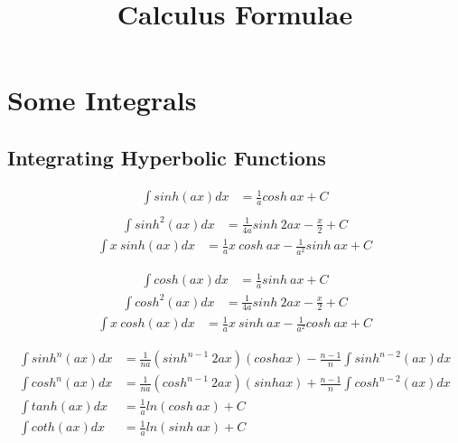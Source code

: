 \documentclass{article}
\title{Calculus Formulae}
\begin{document}
\maketitle

\section{Some Integrals}

\subsection{Integrating Hyperbolic Functions}
\begin{minipage}{.5\linewidth}
\begin{align*}
    \int sinh(ax) dx &= \frac{1}{a} cosh \ ax + C \\
\end{align*}
\begin{align*}
    \int sinh^2(ax) dx &= \frac{1}{4a} sinh \ 2ax - \frac{x}{2} + C
\end{align*}
\begin{align*}
    \int x \ sinh(ax) dx &= \frac{1}{a} x \ cosh \ ax - \frac{1}{a^2} sinh \ ax + C
\end{align*}
\end{minipage}%
\begin{minipage}{.5\linewidth}
\begin{align*}
    \int cosh(ax) dx &= \frac{1}{a}sinh \ ax + C
\end{align*}
\begin{align*}
    \int cosh^2(ax) dx &= \frac{1}{4a} sinh \ 2ax - \frac{x}{2} + C
\end{align*}
\begin{align*}
    \int x \ cosh(ax) dx &= \frac{1}{a} x \ sinh \ ax - \frac{1}{a^2} cosh \ ax + C
\end{align*}
\end{minipage}  


\begin{align*}
    \int sinh^n(ax) dx &= \frac{1}{na} (sinh^{n-1} \ 2ax)(cosh ax) - \frac{n-1}{n} \int sinh^{n-2}(ax) dx \\
    \int cosh^n(ax) dx &= \frac{1}{na} (cosh^{n-1} \ 2ax)(sinh ax) + \frac{n-1}{n} \int cosh^{n-2}(ax) dx \\
    \int tanh(ax) dx &= \frac{1}{a} ln(cosh \ ax) + C \\
    \int coth(ax) dx &= \frac{1}{a} ln(sinh \ ax) + C \\
\end{align*}
\end{document}
